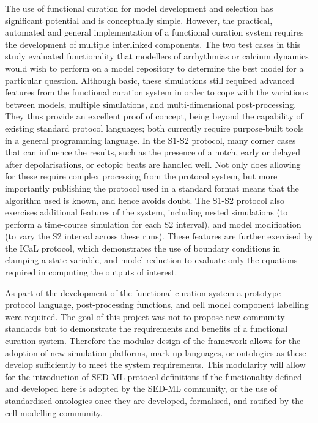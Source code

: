 \documentclass[preprint,authoryear,12pt]{elsarticle}
\newcommand{\changed}[1]{#1}
\begin{document}
The use of functional curation for model development and selection has significant potential and is conceptually simple.
However, the practical, automated and general implementation of a functional curation system requires the development of multiple interlinked components.
The two test cases in this study evaluated functionality that modellers of arrhythmias or calcium dynamics would wish to perform on a model repository to determine the best model for a particular question.
Although basic, these simulations still required advanced features from the functional curation system in order to cope with the variations between models, multiple simulations, and multi-dimensional post-processing.
They thus provide an excellent proof of concept, being beyond the capability of existing standard protocol languages; both currently require purpose-built tools in a general programming language.
In the S1-S2 protocol, many corner cases that can influence the results, such as the presence of a notch, early or delayed after depolarisations, or ectopic beats are handled well.
Not only does allowing for these require complex processing from the protocol system, but more importantly publishing the protocol used in a standard format means that the algorithm used is known, and hence avoids doubt.
The S1-S2 protocol also exercises additional features of the system, including nested simulations (to perform a time-course simulation for each S2 interval), and model modification (to vary the S2 interval across these runs).
These features are further exercised by the ICaL protocol, which demonstrates the use of boundary conditions in clamping a state variable, and model reduction to evaluate only the equations required in computing the outputs of interest.


\changed{As part of the development of the functional curation system a prototype protocol language, post-processing functions, and cell model component labelling were required.
The goal of this project was not to propose new community standards but to demonstrate the requirements and benefits of a functional curation system.
Therefore the modular design of the framework allows for the adoption of new simulation platforms, mark-up languages, or ontologies as these develop sufficiently to meet the system requirements.
This modularity will allow for the introduction of SED-ML protocol definitions if the functionality defined and developed here is adopted by the SED-ML community, or the use of standardised ontologies once they are developed, formalised, and ratified by the cell modelling community.}
\end{document}
